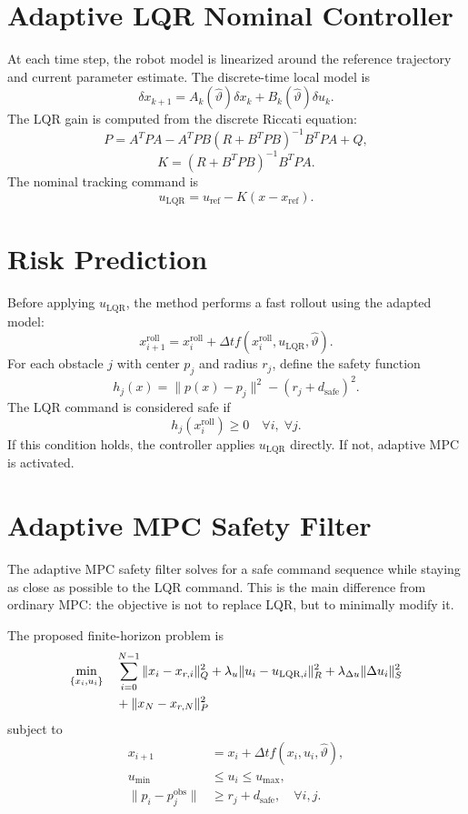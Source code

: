 \documentclass[11pt,a4paper]{article}
\begin{document}
\section{Adaptive LQR Nominal Controller}
At each time step, the robot model is linearized around the reference trajectory and current parameter estimate. The discrete-time local model is
\[
\delta x_{k+1} = A_k(\hat{\vartheta})\delta x_k + B_k(\hat{\vartheta})\delta u_k.
\]
The LQR gain is computed from the discrete Riccati equation:
\[
P = A^T P A - A^T P B(R+B^T P B)^{-1}B^T P A + Q,
\]
\[
K = (R+B^T P B)^{-1}B^T P A.
\]
The nominal tracking command is
\[
u_{\mathrm{LQR}} = u_{\mathrm{ref}} - K(x-x_{\mathrm{ref}}).
\]

\section{Risk Prediction}
Before applying $u_{\mathrm{LQR}}$, the method performs a fast rollout using the adapted model:
\[
x_{i+1}^{\mathrm{roll}} =
x_i^{\mathrm{roll}} + \Delta t f(x_i^{\mathrm{roll}}, u_{\mathrm{LQR}}, \hat{\vartheta}).
\]
For each obstacle $j$ with center $p_j$ and radius $r_j$, define the safety function
\[
h_j(x) = \|p(x)-p_j\|^2 - (r_j + d_{\mathrm{safe}})^2.
\]
The LQR command is considered safe if
\[
h_j(x_i^{\mathrm{roll}}) \geq 0
\quad \forall i,\; \forall j.
\]
If this condition holds, the controller applies $u_{\mathrm{LQR}}$ directly. If not, adaptive MPC is activated.

\section{Adaptive MPC Safety Filter}
The adaptive MPC safety filter solves for a safe command sequence while staying as close as possible to the LQR command. This is the main difference from ordinary MPC: the objective is not to replace LQR, but to minimally modify it.

The proposed finite-horizon problem is
\begin{align}
\min_{\{x_i,u_i\}} \quad
& \sum_{i=0}^{N-1}
\|x_i-x_{r,i}\|_Q^2
+ \lambda_u \|u_i-u_{\mathrm{LQR},i}\|_R^2
+ \lambda_{\Delta u}\|\Delta u_i\|_S^2 \notag \\
& + \|x_N-x_{r,N}\|_P^2
\end{align}
subject to
\begin{align}
x_{i+1} &= x_i + \Delta t f(x_i,u_i,\hat{\vartheta}), \\
u_{\min} &\leq u_i \leq u_{\max}, \\
\|p_i-p_j^{\mathrm{obs}}\| &\geq r_j + d_{\mathrm{safe}},
\quad \forall i,j.
\end{align}
\end{document}
